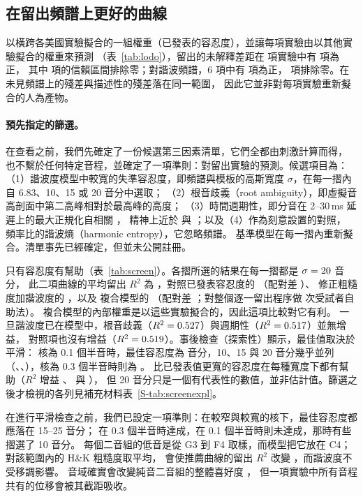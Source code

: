 \documentclass[11pt,a4paper]{article}
\newcommand{\HK}{H\&K}
\begin{document}
\subsection{在留出頻譜上更好的曲線}
\label{sec:lodo}
以橫跨各美國實驗擬合的一組權重（已發表的容忍度），並讓每項實驗由以其他實驗擬合的權重來預測
（表~\ref{tab:lodo}），留出的未解釋差距在 \lodoN{} 項實驗中有 \lodoPos{} 項為正，
其中 \lodoExcl{} 項的信賴區間排除零；對諧波頻譜，6 項中有 \lodoPosHarm{} 項為正，
\lodoExclHarm{} 項排除零。在未見頻譜上的殘差與描述性的殘差落在同一範圍，
因此它並非對每項實驗重新擬合的人為產物。

\paragraph{預先指定的篩選。}
在查看之前，我們先確定了一份候選第三因素清單，它們全都由刺激計算而得，
也不繫於任何特定音程，並確定了一項準則：對留出實驗的預測。候選項目為：
（1）諧波度模型中較寬的失準容忍度，即頻譜與模板的高斯寬度 $\sigma$，在每一摺內自 6.83、10、15 或 20 音分中選取；
（2）根音歧義（root ambiguity）\citep{terhardt1974,parncutt1988}，即虛擬音高剖面中第二高峰相對於最高峰的高度；
（3）時間週期性，即分音在 2--30\,ms 延遲上的最大正規化自相關 \citep{pressnitzer2001}，
精神上近於 \citet{stolzenburg2015} 與 \citet{masina2022}；以及（4）作為刻意設置的對照，
頻率比的諧波熵（harmonic entropy）\citep{erlich}，它忽略頻譜。
基準模型在每一摺內重新擬合。清單事先已經確定，但並未公開註冊。

只有容忍度有幫助（表~\ref{tab:screen}）。各摺所選的結果在每一摺都是 $\sigma=20$ 音分，
此二項曲線的平均留出 $R^2$ 為 \mbRtwoHKHtw，對照已發表容忍度的 \mbRtwoHKH{}（配對差 \mdRtwoTwVsHKH）、
修正粗糙度加諧波度的 \mbRtwoRev{}，以及 \citet{marjieh2024} 複合模型的 \mbRtwoComp{}
（配對差 \mdRtwoTwVsComp；對整個逐一留出程序做 \mbNboot{} 次受試者自助法）。
複合模型的內部權重是以這些實驗擬合的，因此這項比較對它有利。
一旦諧波度已在模型中，根音歧義（$R^2=0.527$）與週期性（$R^2=0.517$）並無增益，
對照項也沒有增益（$R^2=0.519$）。事後檢查（探索性）顯示，最佳值取決於平滑：
核為 0.1 個半音時，最佳容忍度為 \rbBestSigmaOne{} 音分，10、15 與 20 音分幾乎並列
（\rbRtwoOneTen、\rbRtwoOneFifteen、\rbRtwoOneTwenty），核為 0.3 個半音時則為 \rbBestSigmaThree。
比已發表值更寬的容忍度在每種寬度下都有幫助（$R^2$ 增益 \rbGainOne、\rbGainTwo{} 與 \rbGainThree），
但 20 音分只是一個有代表性的數值，並非估計值。篩選之後才檢視的各列見補充材料表~\ref{S-tab:screenexpl}。

在進行平滑檢查之前，我們已設定一項準則：在較窄與較寬的核下，最佳容忍度都應落在 15--25 音分；
在 0.3 個半音時達成，在 0.1 個半音時則未達成，那時有些摺選了 10 音分。
每個二音組的低音是從 G3 到 F4 取樣，而模型把它放在 C4；對該範圍內的 \HK{} 粗糙度取平均，
會使推薦曲線的留出 $R^2$ 改變 \rbdRtwoRegVsHKHtw{}，而諧波度不受移調影響。
音域確實會改變純音二音組的整體喜好度 \citep{kaklamani2025}，
但一項實驗中所有音程共有的位移會被其截距吸收。
\end{document}
